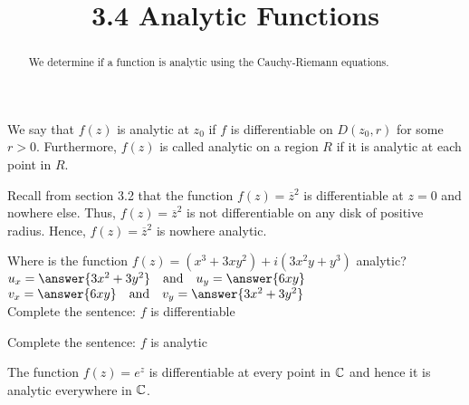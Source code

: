 \documentclass[handout]{ximera}
\title{3.4 Analytic Functions}
\begin{document}
\begin{abstract}
We determine if a function is analytic using the Cauchy-Riemann equations.
\end{abstract}

\maketitle

\begin{definition}
We say that $f(z)$ is analytic at $z_0$ if $f$ is differentiable on $D(z_0, r)$ for some $r>0$.
Furthermore, $f(z)$ is called analytic on a region $R$ if it is analytic at each point in $R$.
\end{definition}


\begin{example}
Recall from section 3.2 that the function $f(z) = \overline{z}^2$ is differentiable 
at $z=0$ and nowhere else. Thus,
$f(z) = \overline{z}^2$ is not differentiable on any disk of positive radius. 
Hence, $f(z) = \overline{z}^2$ is nowhere analytic.
\end{example}

\begin{problem}
Where is the function $f(z) = (x^3 + 3xy^2) +i(3x^2y+y^3)$ analytic?\\
$u_x = \answer{3x^2+3y^2} \quad \text{and} \quad u_y = \answer{6xy}$\\
$v_x = \answer{6xy} \quad \text{and} \quad v_y = \answer{3x^2 + 3y^2}$\\
Complete the sentence:  $f$ is differentiable
\begin{multipleChoice}
\end{multipleChoice}
Complete the sentence:  $f$ is analytic
\begin{multipleChoice}
\end{multipleChoice}
\end{problem}


\begin{example}
The function $f(z) = e^z$ is differentiable at every point in $\mathbb C$ and hence 
it is analytic everywhere in $\mathbb C$.
\end{example}
\end{document}
